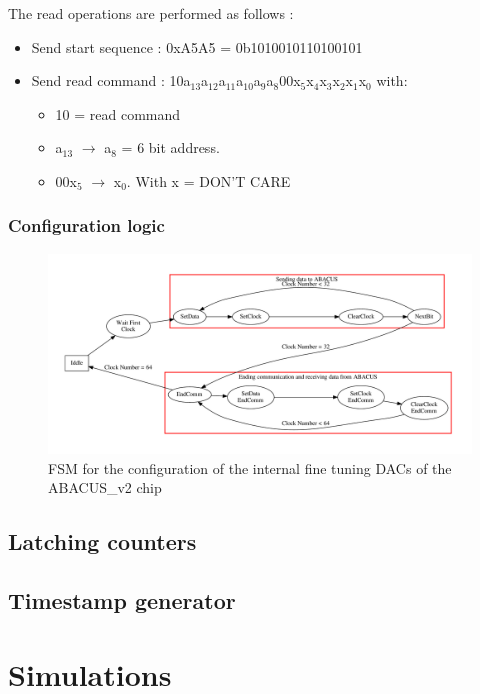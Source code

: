 \noindent The read operations are performed as follows :
\begin{itemize}
	\item Send start sequence : 0xA5A5 = 0b1010010110100101
	\item Send read command : 10a$_{13}$a$_{12}$a$_{11}$a$_{10}$a$_{9}$a$_{8}$00x$_{5}$x$_{4}$x$_{3}$x$_{2}$x$_{1}$x$_{0}$ with:
	\begin{itemize}
		\item 10 = read command
		\item a$_{13}$ $\rightarrow$ a$_{8}$ = 6 bit address.
		\item 00x$_{5}$ $\rightarrow$ x$_{0}$. With x = DON'T CARE 
	\end{itemize}
\end{itemize}

\subsubsection{Configuration logic}


\begin{figure}[H]
	\centering
	\includegraphics[width=1.0\linewidth]{FSMdiagrams/InternalDACsFSM.pdf}
	\caption{FSM for the configuration of the internal fine tuning DACs of the ABACUS\_v2 chip}
	\label{fig:fsmDACs}
\end{figure}

\subsection{Latching counters}\label{Latch}

\subsection{Timestamp generator}\label{Timestamp}

\section{Simulations}

